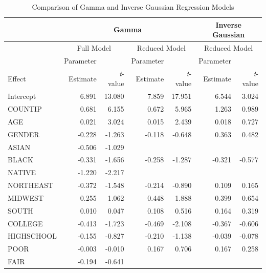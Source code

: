 \begin{table}[h]\begin{center}
\caption{\label{T13:MEPSLongTailModels} Comparison of Gamma and
Inverse Gaussian Regression Models} 
\begin{tabular}{l|rr|rr|rr}
\hline & \multicolumn{4}{|c|}{Gamma} & \multicolumn{2}{|c}{Inverse Gaussian} \\
\hline & \multicolumn{2}{|c|}{Full Model} &
\multicolumn{2}{|c|}{Reduced Model} & \multicolumn{2}{|c}{Reduced
Model} \\ \cline{2-7}
& Parameter &  & Parameter &  & Parameter &  \\
Effect & Estimate & \textit{t}-value & Estimate & \textit{t}-value &
Estimate & \textit{t}-value \\ \hline
 Intercept &      6.891 &     13.080 &      7.859 &     17.951 &      6.544 &      3.024 \\
   COUNTIP &      0.681 &      6.155 &      0.672 &      5.965 &      1.263 &      0.989 \\
       AGE &      0.021 &      3.024 &      0.015 &      2.439 &      0.018 &      0.727 \\
    GENDER &     -0.228 &     -1.263 &     -0.118 &     -0.648 &      0.363 &      0.482 \\
     ASIAN &     -0.506 &     -1.029 &            &            &            &            \\
     BLACK &     -0.331 &     -1.656 &     -0.258 &     -1.287 &     -0.321 &     -0.577 \\
    NATIVE &     -1.220 &     -2.217 &            &            &            &            \\
 NORTHEAST &     -0.372 &     -1.548 &     -0.214 &     -0.890 &      0.109 &      0.165 \\
   MIDWEST &      0.255 &      1.062 &      0.448 &      1.888 &      0.399 &      0.654 \\
     SOUTH &      0.010 &      0.047 &      0.108 &      0.516 &      0.164 &      0.319
     \\\hline
   COLLEGE &     -0.413 &     -1.723 &     -0.469 &     -2.108 &     -0.367 &     -0.606 \\
HIGHSCHOOL &     -0.155 &     -0.827 &     -0.210 &     -1.138 &
-0.039 &     -0.078 \\\hline
      POOR &     -0.003 &     -0.010 &      0.167 &      0.706 &      0.167 &      0.258 \\
      FAIR &     -0.194 &     -0.641 &            &            &            &            \\

\end{tabular}
\end{center}
\end{table}
